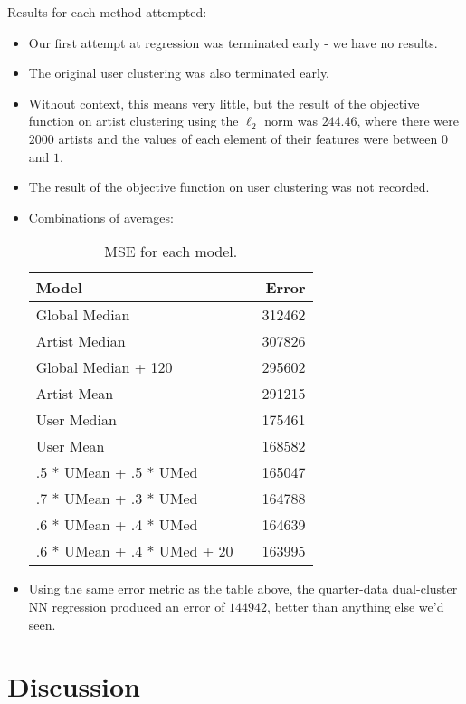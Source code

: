 \documentclass[11pt]{article}
\begin{document}
\noindent Results for each method attempted: 
\begin{itemize}
	\item Our first attempt at regression was terminated early - we have no results.
	\item The original user clustering was also terminated early.
	\item Without context, this means very little, but the result of the objective function on artist clustering using the $\ell_2$ norm was $244.46$, where there were $2000$ artists and the values of each element of their features were between $0$ and $1$.
	\item The result of the objective function on user clustering was not recorded.
	\item Combinations of averages:
	\begin{table}[h]
		\centering
		\begin{tabular}{llr}
			\toprule
			Model &  & Error \\
			\midrule
			Global Median & & 312462 \\
			Artist Median & & 307826 \\
			Global Median + 120 & & 295602 \\
			Artist Mean & & 291215\\
			User Median & & 175461  \\
			User Mean & &168582 \\
			.5 * UMean + .5 * UMed & & 165047 \\
			.7 * UMean + .3 * UMed & & 164788 \\
			.6 * UMean + .4 * UMed & & 164639 \\
			.6 * UMean + .4 * UMed + 20 & & 163995 \\
			\bottomrule
		\end{tabular}
		\caption{\label{tab:results} MSE for each model.}
	\end{table}

	\item Using the same error metric as the table above, the quarter-data dual-cluster NN regression produced an error of $144942$, better than anything else we'd seen.
\end{itemize}


\section{Discussion} 
\end{document}
